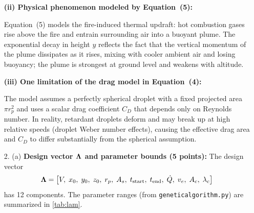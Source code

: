 \documentclass{article}
\begin{document}
\begin{enumerate}
\begin{answer}
\textbf{(ii) Physical phenomenon modeled by Equation~(5):}

Equation~(5) models the fire-induced thermal updraft: hot combustion gases rise above the fire and entrain surrounding air into a buoyant plume. The exponential decay in height $y$ reflects the fact that the vertical momentum of the plume dissipates as it rises, mixing with cooler ambient air and losing buoyancy; the plume is strongest at ground level and weakens with altitude.

\textbf{(iii) One limitation of the drag model in Equation~(4):}

The model assumes a perfectly spherical droplet with a fixed projected area $\pi r_p^2$ and uses a scalar drag coefficient $C_D$ that depends only on Reynolds number. In reality, retardant droplets deform and may break up at high relative speeds (droplet Weber number effects), causing the effective drag area and $C_D$ to differ substantially from the spherical assumption.
\end{answer}



\item[2. (a)] \textbf{Design vector $\mbox{\boldmath $\Lambda$}$ and parameter bounds (5 points):}
The design vector
\begin{equation}
    \mbox{\boldmath $\Lambda$} = \bigl[V,\; x_0,\; y_0,\; z_0,\; r_p,\; A_s,\; t_\text{start},\; t_\text{end},\; \dot{Q},\; v_e,\; A_c,\; \lambda_c\bigr]
    \label{eq:lam}
\end{equation}
has 12 components.
The parameter ranges (from \texttt{geneticalgorithm.py}) are summarized in \cref{tab:lam}.


\end{enumerate}
\end{document}
